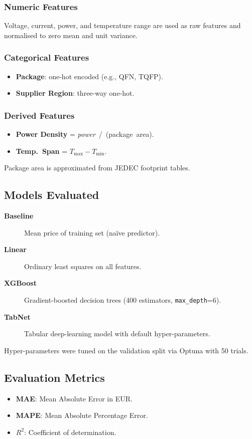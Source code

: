 \subsubsection{Numeric Features}
Voltage, current, power, and temperature range are used as raw features and normalised to zero mean and unit variance.

\subsubsection{Categorical Features}
\begin{itemize}
  \item \textbf{Package}: one-hot encoded (e.g., QFN, TQFP).
  \item \textbf{Supplier Region}: three-way one-hot.
\end{itemize}

\subsubsection{Derived Features}
\begin{itemize}
  \item \textbf{Power Density} = \textit{power}~\slash~(package~area).
  \item \textbf{Temp.~Span}   = $T_{\max}-T_{\min}$.
\end{itemize}
Package area is approximated from JEDEC footprint tables.

\subsection{Models Evaluated}
\begin{description}
  \item[\textbf{Baseline}] Mean price of training set (naïve predictor).
  \item[\textbf{Linear}] Ordinary least squares on all features.
  \item[\textbf{XGBoost}] Gradient-boosted decision trees (400 estimators, \texttt{max\_depth}=6).
  \item[\textbf{TabNet}] Tabular deep-learning model with default hyper-parameters.
\end{description}
Hyper-parameters were tuned on the validation split via Optuna with 50 trials.

\subsection{Evaluation Metrics}
\begin{itemize}
  \item \textbf{MAE}: Mean Absolute Error in EUR.
  \item \textbf{MAPE}: Mean Absolute Percentage Error.
  \item \textbf{$R^{2}$}: Coefficient of determination.
\end{itemize}

